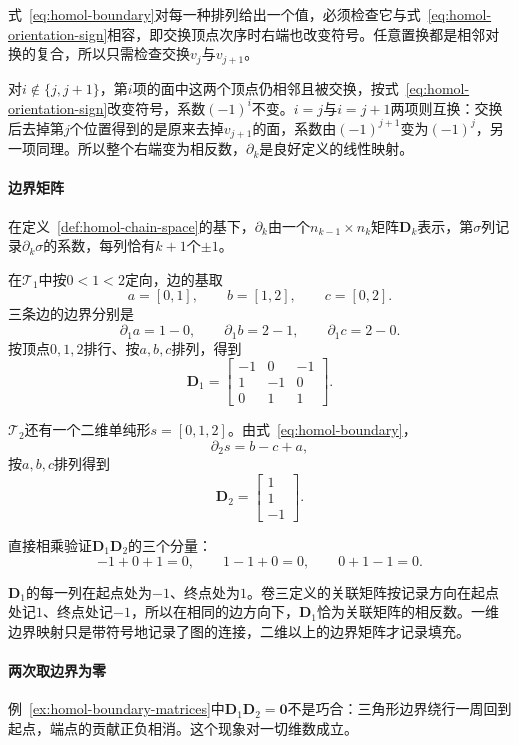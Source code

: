 式~\eqref{eq:homol-boundary}对每一种排列给出一个值，必须检查它与式~\eqref{eq:homol-orientation-sign}相容，即交换顶点次序时右端也改变符号。任意置换都是相邻对换的复合，所以只需检查交换$v_j$与$v_{j+1}$。

对$i\notin\{j,j+1\}$，第$i$项的面中这两个顶点仍相邻且被交换，按式~\eqref{eq:homol-orientation-sign}改变符号，系数$(-1)^i$不变。$i=j$与$i=j+1$两项则互换：交换后去掉第$j$个位置得到的是原来去掉$v_{j+1}$的面，系数由$(-1)^{j+1}$变为$(-1)^j$，另一项同理。所以整个右端变为相反数，$\partial_k$是良好定义的线性映射。

\paragraph{边界矩阵}
在定义~\ref{def:homol-chain-space}的基下，$\partial_k$由一个$n_{k-1}\times n_k$矩阵$\bm D_k$表示，第$\sigma$列记录$\partial_k\sigma$的系数，每列恰有$k+1$个$\pm1$。

\begin{example}[两个三角形的边界矩阵]
\label{ex:homol-boundary-matrices}
在$\mathcal T_1$中按$0<1<2$定向，边的基取
\[
 a=[0,1],\qquad b=[1,2],\qquad c=[0,2].
\]
三条边的边界分别是
\[
 \partial_1a=1-0,\qquad\partial_1b=2-1,\qquad\partial_1c=2-0.
\]
按顶点$0,1,2$排行、按$a,b,c$排列，得到
\[
 \bm D_1=\begin{bmatrix}-1&0&-1\\1&-1&0\\0&1&1\end{bmatrix}.
\]

$\mathcal T_2$还有一个二维单纯形$s=[0,1,2]$。由式~\eqref{eq:homol-boundary}，
\[
 \partial_2s=b-c+a,
\]
按$a,b,c$排列得到
\[
 \bm D_2=\begin{bmatrix}1\\1\\-1\end{bmatrix}.
\]

直接相乘验证$\bm D_1\bm D_2$的三个分量：
\[
 -1+0+1=0,\qquad 1-1+0=0,\qquad 0+1-1=0.
\]
\end{example}

$\bm D_1$的每一列在起点处为$-1$、终点处为$1$。卷三定义的关联矩阵按记录方向在起点处记$1$、终点处记$-1$，所以在相同的边方向下，$\bm D_1$恰为关联矩阵的相反数。一维边界映射只是带符号地记录了图的连接，二维以上的边界矩阵才记录填充。

\paragraph{两次取边界为零}
例~\ref{ex:homol-boundary-matrices}中$\bm D_1\bm D_2=\bm 0$不是巧合：三角形边界绕行一周回到起点，端点的贡献正负相消。这个现象对一切维数成立。

